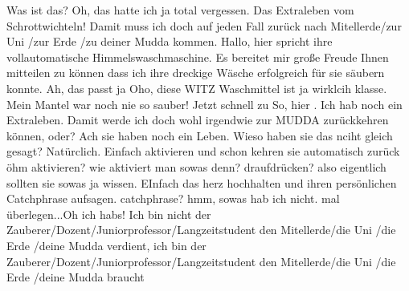 \begin{verseplay}[5em]
\s{\Gandalf} Was ist das? Oh, das hatte ich ja total vergessen. Das Extraleben vom Schrottwichteln! Damit muss ich doch auf jeden Fall zurück nach Mitellerde/zur Uni /zur Erde /zu deiner Mudda kommen.
\s{\Waschmaschine} Hallo, hier spricht ihre vollautomatische Himmelswaschmaschine. Es bereitet mir große Freude Ihnen mitteilen zu können dass ich ihre dreckige Wäsche erfolgreich für sie säubern konnte.
\s{\Gandalf} Ah, das passt ja  Oho, diese WITZ Waschmittel ist ja wirklcih klasse. Mein Mantel war noch nie so sauber! Jetzt schnell zu \Petrus {}
\s{\Gandalf} So, hier . Ich hab noch ein Extraleben. Damit werde ich doch wohl irgendwie zur MUDDA zurückkehren können, oder?
\s{\Petrus} Ach sie haben noch ein Leben. Wieso haben sie das nciht gleich gesagt? Natürclich. Einfach aktivieren und schon kehren sie automatisch zurück
\s{\Gandalf} öhm aktivieren? wie aktiviert man sowas denn? draufdrücken?
\s{\Petrus} also eigentlich sollten sie sowas ja wissen. EInfach das herz hochhalten und ihren persönlichen Catchphrase aufsagen.
\s{\Gandalf} catchphrase? hmm, sowas hab ich nicht. mal überlegen...Oh ich habs!  Ich bin nicht der Zauberer/Dozent/Juniorprofessor/Langzeitstudent den Mitellerde/die Uni /die Erde /deine Mudda verdient, ich bin der Zauberer/Dozent/Juniorprofessor/Langzeitstudent den Mitellerde/die Uni /die Erde /deine Mudda braucht
\end{verseplay}


